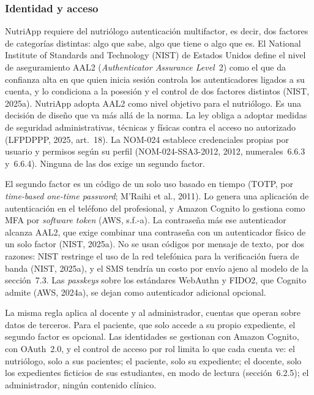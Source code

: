 \documentclass[12pt, a4paper]{article}
\begin{document}
\subsubsection{Identidad y acceso}
 
NutriApp requiere del nutriólogo autenticación multifactor, es decir,
dos factores de categorías distintas: algo que sabe, algo que tiene o
algo que es. El National Institute of Standards and Technology (NIST) de
Estados Unidos define el nivel de aseguramiento AAL2
(\textit{Authenticator Assurance Level}~2) como el que da confianza alta
en que quien inicia sesión controla los autenticadores ligados a su
cuenta, y lo condiciona a la posesión y el control de dos factores
distintos (NIST, 2025a). NutriApp adopta AAL2 como nivel objetivo para
el nutriólogo. Es una decisión de diseño que va más allá de la norma. La
ley obliga a adoptar medidas de seguridad administrativas, técnicas y
físicas contra el acceso no autorizado (LFPDPPP, 2025, art.~18). La
NOM-024 establece credenciales propias por usuario y permisos según su
perfil (NOM-024-SSA3-2012, 2012, numerales~6.6.3 y~6.6.4). Ninguna de
las dos exige un segundo factor.

El segundo factor es un código de un solo uso basado en tiempo (TOTP,
por \textit{time-based one-time password}; M'Raihi et al., 2011). Lo
genera una aplicación de autenticación en el teléfono del profesional, y
Amazon Cognito lo gestiona como MFA por \textit{software token} (AWS,
s.f.-a). La contraseña más ese autenticador alcanza AAL2, que exige
combinar una contraseña con un autenticador físico de un solo factor
(NIST, 2025a). No se usan códigos por mensaje de texto, por dos razones:
NIST restringe el uso de la red telefónica para la verificación fuera de
banda (NIST, 2025a), y el SMS tendría un costo por envío ajeno al modelo
de la sección~7.3. Las \textit{passkeys} sobre los estándares WebAuthn y
FIDO2, que Cognito admite (AWS, 2024a), se dejan como autenticador
adicional opcional.

La misma regla aplica al docente y al administrador, cuentas que operan
sobre datos de terceros. Para el paciente, que solo accede a su propio
expediente, el segundo factor es opcional. Las identidades se gestionan
con Amazon Cognito, con OAuth~2.0, y el control de acceso por rol limita
lo que cada cuenta ve: el nutriólogo, solo a sus pacientes; el paciente,
solo su expediente; el docente, solo los expedientes ficticios de sus
estudiantes, en modo de lectura (sección~6.2.5); el administrador,
ningún contenido clínico.
 
\end{document}
